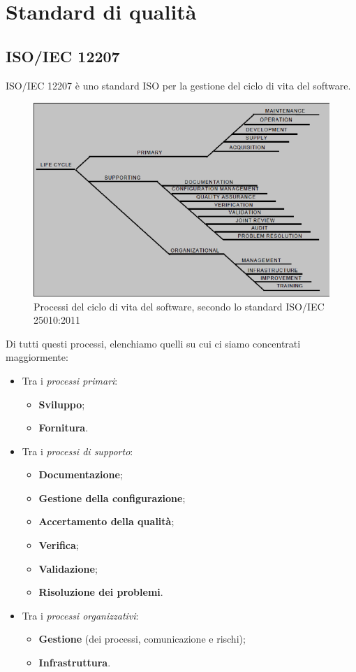 \section{Standard di qualità}
\subsection{ISO/IEC 12207}
ISO/IEC 12207 è uno standard ISO per la gestione del ciclo di vita del software.\\
\begin{figure}[h!]
	\centering
	\includegraphics[scale=0.4]{res/images/ISO_12207.png}
	\caption{Processi del ciclo di vita del software, secondo lo standard ISO/IEC 25010:2011}
\end{figure}
Di tutti questi processi, elenchiamo quelli su cui ci siamo concentrati maggiormente:
\begin{itemize}
	\item Tra i \textit{processi primari}:
		\begin{itemize}
			\item \textbf{Sviluppo};
			\item \textbf{Fornitura}.
		\end{itemize}
	\item Tra i \textit{processi di supporto}:
		\begin{itemize}
			\item \textbf{Documentazione};
			\item \textbf{Gestione della configurazione};
			\item \textbf{Accertamento della qualità};
			\item \textbf{Verifica};
			\item \textbf{Validazione};
			\item \textbf{Risoluzione dei problemi}.
		\end{itemize}
	\item Tra i \textit{processi organizzativi}:
	\begin{itemize}
		\item \textbf{Gestione} (dei processi, comunicazione e rischi);
		\item \textbf{Infrastruttura}.
	\end{itemize}
\end{itemize}

